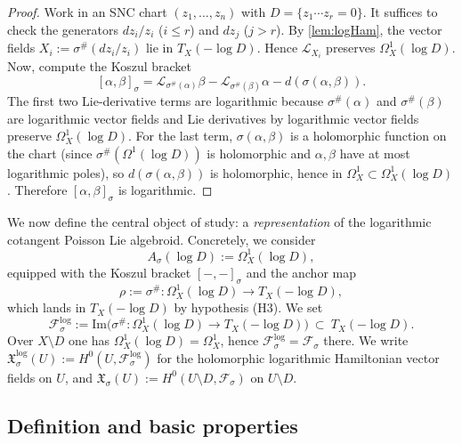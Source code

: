 \documentclass[11pt]{amsart}
\theoremstyle{plain}
\theoremstyle{definition}
\newcommand{\fol}{\mathcal{F}}
\theoremstyle{definition}
\newcommand{\im}{\mathrm{Im}}
\begin{document}
\begin{proof}
Work in an SNC chart $(z_1,\dots,z_n)$ with $D=\{z_1\cdots z_r=0\}$.
It suffices to check the generators $dz_i/z_i$ ($i\le r$) and $dz_j$ ($j>r$).
By \ref{lem:logHam}, the vector fields $X_i:=\sigma^\#(dz_i/z_i)$ lie in $T_X(-\log D)$.
Hence $\mathcal L_{X_i}$ preserves $\Omega_X^1(\log D)$.
Now, compute the Koszul bracket
\[
[\alpha,\beta]_\sigma=\mathcal L_{\sigma^\#(\alpha)}\beta-\mathcal L_{\sigma^\#(\beta)}\alpha-d(\sigma(\alpha,\beta)).
\]
The first two Lie-derivative terms are logarithmic because $\sigma^\#(\alpha)$ and $\sigma^\#(\beta)$ are logarithmic
vector fields and Lie derivatives by logarithmic vector fields preserve $\Omega_X^1(\log D)$.
For the last term, $\sigma(\alpha,\beta)$ is a holomorphic function on the chart (since $\sigma^\#(\Omega^1(\log D))$
is holomorphic and $\alpha,\beta$ have at most logarithmic poles), so $d(\sigma(\alpha,\beta))$ is holomorphic, hence
in $\Omega_X^1\subset\Omega_X^1(\log D)$.
Therefore $[\alpha,\beta]_\sigma$ is logarithmic.
\end{proof}



We now define the central object of study: a \emph{representation} of the logarithmic cotangent
Poisson Lie algebroid. Concretely, we consider
$$
A_\sigma(\log D):=\Omega_X^1(\log D),
$$
equipped with the Koszul bracket $[-,-]_\sigma$ and the anchor map
$$
\rho:=\sigma^\#:\Omega_X^1(\log D)\longrightarrow T_X(-\log D),
$$
which lands in $T_X(-\log D)$ by hypothesis (H3).
We set
$$
\fol_\sigma^{\log}
:=
\im \big(\sigma^\#:\Omega_X^1(\log D)\to T_X(-\log D)\big)
\ \subset\ T_X(-\log D).
$$
Over $X\setminus D$ one has $\Omega_X^1(\log D)=\Omega_X^1$, hence $\fol_\sigma^{\log}=\fol_\sigma$ there.
We write $\mathfrak X_\sigma^{\log}(U):= H^0(U,\fol_\sigma^{\log})$ for the holomorphic logarithmic Hamiltonian
vector fields on $U$, and $\mathfrak X_\sigma(U):= H^0(U\setminus D,\fol_\sigma)$ on $U\setminus D$.
 

\subsection{Definition and basic properties}
\end{document}
